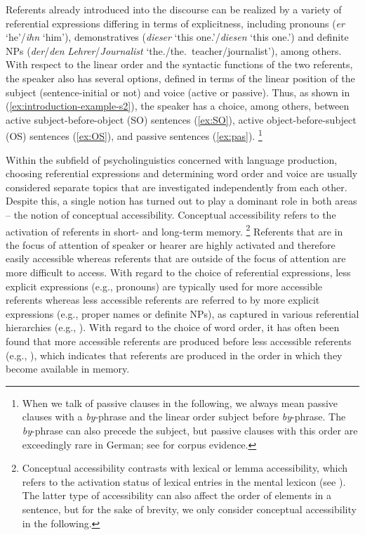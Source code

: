 \documentclass[output=paper,colorlinks,citecolor=brown]{langscibook}
\begin{document}
Referents already introduced into the discourse can be realized by a variety of referential expressions differing in terms of explicitness, including pronouns (\textit{er} `he'/\textit{ihn} `him'), demonstratives (\textit{dieser} `this one.\NOM'/\textit{diesen} `this one.\ACC') and definite NPs (\textit{der}/\textit{den} \textit{Lehrer}/\textit{Journalist} `the.\NOM/the.\ACC\ teacher/journalist'), among others. With respect to the linear order and the syntactic functions of the two referents, the speaker also has several options, defined in terms of the linear position of the subject (sentence-initial or not) and voice (active or passive). Thus, as shown in (\ref{ex:introduction-example-s2}), the speaker has a choice, among others, between active subject-before-object (SO) sentences (\ref{ex:SO}), active object-before-subject (OS) sentences (\ref{ex:OS}), and passive sentences (\ref{ex:pas}).%
\footnote{When we talk of passive clauses in the following, we always mean passive clauses with a \textit{by}-phrase and the linear order subject before \textit{by}-phrase. The \textit{by}-phrase can also precede the subject, but passive clauses with this order are exceedingly rare in German; see \citet[Table 1]{Bader::Meng-18} for corpus evidence.}

Within the subfield of psycholinguistics concerned with language production, choosing referential expressions and determining word order and voice are usually considered separate topics that are investigated independently from each other. Despite this, a single notion has turned out to play a dominant role in both areas -- the notion of conceptual accessibility. Conceptual accessibility refers to the activation of referents in short- and long-term memory.%
\footnote{Conceptual accessibility contrasts with lexical or lemma accessibility, which refers to the activation status of lexical entries in the mental lexicon (see \citealt{Ferreira::Dell-00}). The latter type of accessibility can also affect the order of elements in a sentence, but for the sake of brevity, we only consider conceptual accessibility in the following.}
Referents that are in the focus of attention of speaker or hearer are highly activated and therefore easily accessible whereas referents that are outside of the focus of attention are more difficult to access. With regard to the choice of referential expressions, less explicit expressions (e.g., pronouns) are typically used for more accessible referents whereas less accessible referents are referred to by more explicit expressions (e.g., proper names or definite NPs), as captured in various referential hierarchies (e.g., \citealt{Gundel::al-93, Ariel-01}). With regard to the choice of word order, it has often been found that more accessible referents are produced before less accessible referents (e.g., \citealt{Bock::Warren-85, McDonald::al-93, Ferreira-94, Prat-Sala::Branigan-00}), which indicates that referents are produced in the order in which they become available in memory.
\end{document}
